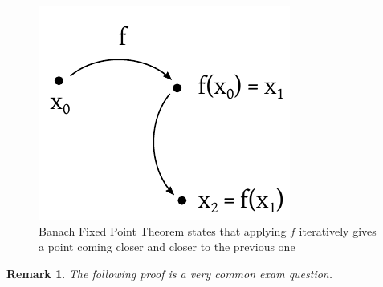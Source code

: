 \documentclass{article}
\newtheorem{remark}{Remark}  \numberwithin{remark}{section}
\begin{document}
\begin{figure}[t]
  \begin{center}
    \includegraphics{img/07b_banach_fixed_point_theorem.pdf}
    \caption{Banach Fixed Point Theorem states that applying $f$ iteratively gives a point coming closer and closer to the previous one}
    \label{img:banachfixed}
  \end{center}
\end{figure}

\begin{remark}
  The following proof is a very common exam question.
\end{remark}
\end{document}
